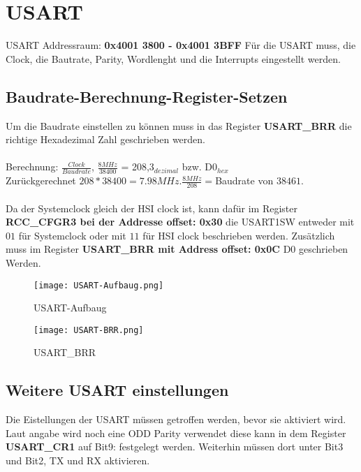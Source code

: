\section{USART}
    USART Addressraum:  \textbf{0x4001 3800 - 0x4001 3BFF}
    Für die USART muss, die Clock, die Bautrate, Parity, Wordlenght und die Interrupts eingestellt werden. 
    \subsection{Baudrate-Berechnung-Register-Setzen}
        Um die Baudrate einstellen zu können muss in das Register \textbf{USART\_BRR} die richtige Hexadezimal Zahl geschrieben werden.\\\\
        Berechnung: $\frac{Clock}{Baudrate}$, $\frac{8MHz}{38400}$ = 208,3$_{dezimal}$ bzw. D0$_{hex}$\\
        Zurückgerechnet $208*38400 = 7.98MHz. \frac{8MHz}{208} = $Baudrate von $38461$.\\\\
        Da der Systemclock gleich der HSI clock ist, kann dafür im Register \textbf{RCC\_CFGR3 bei der Addresse offset: 0x30} die USART1SW entweder 
        mit $01$ für Systemclock oder mit $11$ für HSI clock beschrieben werden. Zusätzlich muss im Register \textbf{USART\_BRR mit Address offset: 0x0C} D0 geschrieben
        Werden.
        
        \begin{figure}[!htb]
            \centering
            \texttt{[image: USART-Aufbaug.png]}
            \caption{USART-Aufbaug}
            \label{caption:USART-Aufbaug}
        \end{figure}
        \begin{figure}[!htb]
            \centering
            \texttt{[image: USART-BRR.png]}
            \caption{USART\_BRR}
            \label{caption:USART-BRR}
        \end{figure}
      
\newpage
    \subsection{Weitere USART einstellungen}
        Die Eistellungen der USART müssen getroffen werden, bevor sie aktiviert wird. Laut angabe wird noch eine ODD Parity verwendet diese kann in dem Register
        \textbf{USART\_CR1} auf Bit9: festgelegt werden. Weiterhin müssen dort unter Bit3 und Bit2, TX und RX aktivieren.

